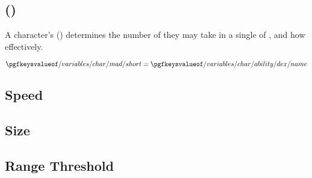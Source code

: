 \subsection{ ()}
A character's  () determines the number of  they may take in a single  of , and how effectively.

\begin{equation}
	\getvalue{char/mad/short} = \getvalue{char/ability/dex/name}
\end{equation}

\subsection{Speed}
\lipsum[1-1]

\subsection{Size}
\lipsum[1-1]

\subsection{Range Threshold}
\lipsum[1-1]